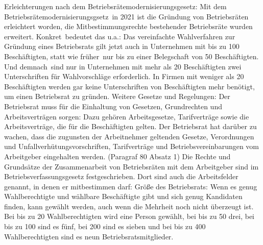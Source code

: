 Erleichterungen nach dem Betriebsrätemodernisierungsgesetz: 
Mit dem Betriebsrätemodernisierungsgsetz in 2021 ist die Gründung von Betriebsräten erleichtert worden, die Mitbestimmungsrechte bestehender Betriebsräte wurden erweitert. Konkret bedeutet das u.a.: Das vereinfachte Wahlverfahren zur Gründung eines Betriebsrats gilt jetzt auch in Unternehmen mit bis zu 100 Beschäftigten, statt wie früher nur bis zu einer Belegschaft von 50 Beschäftigten. Und demnach sind nur in Unternehmen mit mehr als 20 Beschäftigten zwei Unterschriften für Wahlvorschläge erforderlich. In Firmen mit weniger als 20 Beschäftigten werden gar keine Unterschriften von Beschäftigten mehr benötigt, um einen Betriebsrat zu gründen.
\newline
Weitere Gesetze und Regelungen: Der Betriebsrat muss für die Einhaltung von Gesetzen, Grundrechten und Arbeitsverträgen sorgen: Dazu gehören Arbeitsgesetze, Tarifverträge sowie die Arbeitsverträge, die für die Beschäftigten gelten. Der Betriebsrat hat darüber zu wachen, dass die zugunsten der Arbeitnehmer geltenden Gesetze, Verordnungen und Unfallverhütungsvorschriften, Tarifverträge und Betriebsvereinbarungen vom Arbeitgeber eingehalten werden. (Paragraf 80 Absatz 1)
\newline 
Die Rechte und Grundsätze der Zusammenarbeit von Betriebsräten mit dem Arbeitgeber sind im Betriebsverfassungsgesetz festgeschrieben. Dort sind auch die Arbeitsfelder genannt, in denen er mitbestimmen darf:
\newline 
Größe des Betriebsrats: Wenn es genug Wahlberechtigte und wählbare Beschäftigte gibt und sich genug Kandidaten finden, kann gewählt werden, auch wenn die Mehrheit noch nicht überzeugt ist. Bei bis zu 20 Wahlberechtigten wird eine Person gewählt, bei bis zu 50 drei, bei bis zu 100 sind es fünf, bei 200 sind es sieben und bei bis zu 400 Wahlberechtigten sind es neun Betriebsratsmitglieder.
